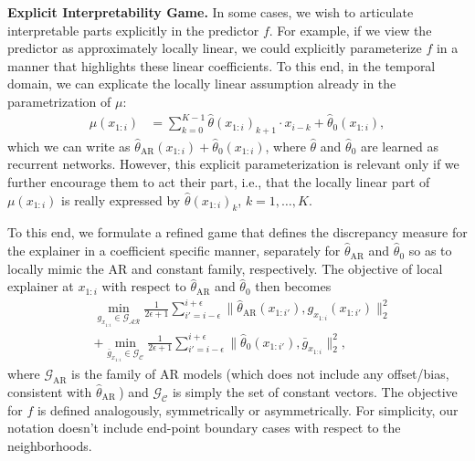 \label{sec:meta}
{\bf Explicit Interpretability Game.}
In some cases, we wish to articulate interpretable parts explicitly in the predictor $f$. For example, if we view the predictor as approximately locally linear, we could explicitly parameterize $f$ in a manner that highlights these linear coefficients. To this end, in the temporal domain, we can explicate the locally linear assumption already in the parametrization of $\mu$:
\begin{align}
\mu(x_{1:i}) & = \sum_{k=0}^{K-1} \hat{\theta}(x_{1:i})_{k+1} \cdot x_{i-k} + \hat{\theta}_0(x_{1:i}),\label{eq:explicit}
\end{align}
which we can write as $\hat{\theta}_\text{AR}(x_{1:i}) + \hat{\theta}_0(x_{1:i})$, where $\hat{\theta}$ and $\hat{\theta}_0$ are learned as recurrent networks. However, this explicit parameterization is relevant only if we further encourage them to act their part, i.e., that the locally linear part of $\mu(x_{1:i})$ is really expressed by $\hat{\theta}(x_{1:i})_{k}$, $k=1,\ldots,K$.


To this end, we formulate a refined game that defines the discrepancy measure for the explainer in a coefficient specific manner, separately for $\hat{\theta}_\text{AR}$ and $\hat{\theta}_0$ so as to locally mimic the AR and constant family, respectively. %
The objective of local explainer at $x_{1:i}$ with respect to $\hat{\theta}_\text{AR}$ and $\hat{\theta}_0$ then becomes
\begin{align}
& \min_{g_{x_{1:i}} \in \mathcal{G_\text{AR}}} 
\frac{1}{2\epsilon+1} 
\sum_{i'=i-\epsilon}^{i+\epsilon} 
\|\hat{\theta}_\text{AR}(x_{1:i'}), g_{x_{1:i}}(x_{1:i'})\|_2^2\nonumber\\
& + \min_{\bar{g}_{x_{1:i}} \in \mathcal{G_C}} 
\frac{1}{2\epsilon+1} 
\sum_{i'=i-\epsilon}^{i+\epsilon} 
\|\hat{\theta}_{0}(x_{1:i'}), \bar{g}_{x_{1:i}}\|_2^2,
\label{eq:factor_local_deviation}
\end{align}
where $\mathcal{G}_\text{AR}$ is the family of AR models (which does not include any offset/bias, consistent with $\hat{\theta}_\text{AR }$) and $\mathcal{G_C}$ is simply the set of constant vectors. The objective for $f$ is defined analogously, symmetrically or asymmetrically. For simplicity, our notation doesn't include end-point boundary cases with respect to the neighborhoods. 
